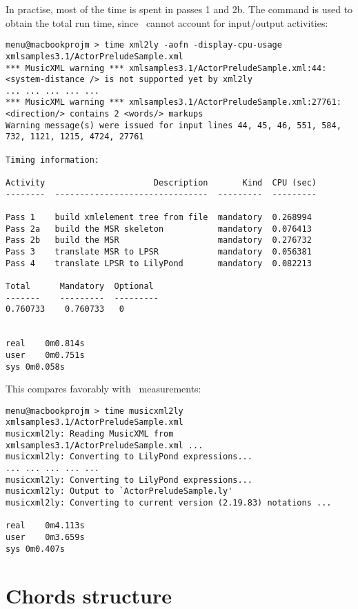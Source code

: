 In practise, most of the time is spent in passes 1 and 2b. The  command is used to obtain the total run time, since \xmlToLy\ cannot account for input/output activities:
\begin{lstlisting}[language=MusicXML]
menu@macbookprojm > time xml2ly -aofn -display-cpu-usage xmlsamples3.1/ActorPreludeSample.xml
*** MusicXML warning *** xmlsamples3.1/ActorPreludeSample.xml:44: <system-distance /> is not supported yet by xml2ly
... ... ... ... ...
*** MusicXML warning *** xmlsamples3.1/ActorPreludeSample.xml:27761: <direction/> contains 2 <words/> markups
Warning message(s) were issued for input lines 44, 45, 46, 551, 584, 732, 1121, 1215, 4724, 27761

Timing information:

Activity                      Description       Kind  CPU (sec)
--------  -------------------------------  ---------  ---------

Pass 1    build xmlelement tree from file  mandatory  0.268994
Pass 2a   build the MSR skeleton           mandatory  0.076413
Pass 2b   build the MSR                    mandatory  0.276732
Pass 3    translate MSR to LPSR            mandatory  0.056381
Pass 4    translate LPSR to LilyPond       mandatory  0.082213

Total      Mandatory  Optional
-------    ---------  ---------
0.760733    0.760733   0


real	0m0.814s
user	0m0.751s
sys	0m0.058s
\end{lstlisting}

This compares favorably with \mxmlToLy\ measurements:
\begin{lstlisting}[language=MusicXML]
menu@macbookprojm > time musicxml2ly xmlsamples3.1/ActorPreludeSample.xml
musicxml2ly: Reading MusicXML from xmlsamples3.1/ActorPreludeSample.xml ...
musicxml2ly: Converting to LilyPond expressions...
... ... ... ... ...
musicxml2ly: Converting to LilyPond expressions...
musicxml2ly: Output to `ActorPreludeSample.ly'
musicxml2ly: Converting to current version (2.19.83) notations ...

real	0m4.113s
user	0m3.659s
sys	0m0.407s
\end{lstlisting}


\section{Chords structure}

